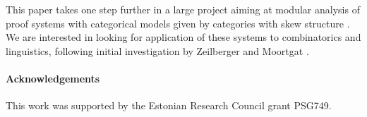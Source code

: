 \documentclass[submission,copyright,creativecommons]{eptcs}
\theoremstyle{definition}
\begin{document}
This paper takes one step further in a large project aiming at modular analysis of proof systems with categorical models given by categories with skew structure \cite{zeilberger:semiassociative:19, uustalu:sequent:2021,uustalu:proof:nodate,uustalu:deductive:nodate,veltri:coherence:2021,UVW:protsn}. We are interested in looking for application of these systems to combinatorics and linguistics, following initial investigation by Zeilberger \cite{zeilberger:semiassociative:19} and Moortgat \cite{moortgat:tamari:20}.


\paragraph{Acknowledgements}
This work was supported by the Estonian Research Council grant PSG749.

  
  
\end{document}

